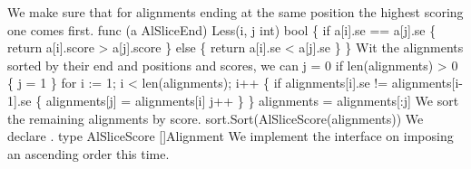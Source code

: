 We make sure that for alignments ending at the same position the
highest scoring one comes first.
\nwenddocs{}\endmoddef\nwstartdeflinemarkup{}\nwenddeflinemarkup
func (a AlSliceEnd) Less(i, j int) bool \{
          if a[i].se == a[j].se \{
                  return a[i].score > a[j].score
          \} else \{
                  return a[i].se < a[j].se
          \}
\}
\nwendcode{}\nwdocspar
Wit the alignments sorted by their end and positions and scores, we
can 
\nwenddocs{}\endmoddef\nwstartdeflinemarkup{}\nwenddeflinemarkup
j = 0
if len(alignments) > 0 \{ j = 1 \}
for i := 1; i < len(alignments); i++ \{
          if alignments[i].se != alignments[i-1].se \{
                  alignments[j] = alignments[i]
                  j++
          \}
\}
alignments = alignments[:j]
\nwendcode{}\nwdocspar
We sort the remaining alignments by score.
\nwenddocs{}\endmoddef\nwstartdeflinemarkup{}\nwenddeflinemarkup
sort.Sort(AlSliceScore(alignments))
\nwendcode{}\nwdocspar
We declare .
\nwenddocs{}\plusendmoddef\nwstartdeflinemarkup{}\nwenddeflinemarkup
type AlSliceScore []Alignment
\nwendcode{}\nwdocspar
We implement the  interface on  imposing an
ascending order this time.
